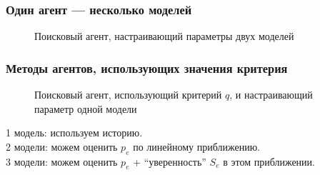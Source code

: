 \documentclass[10pt,utf8]{beamer}
\begin{document}

\begin{frame}
  \frametitle{Один агент --- несколько моделей}


  \begin{figure}[htb!]
    \begin{center}
      
    \end{center}
    \caption{Поисковый агент, настраивающий параметры двух моделей}
    \label{atu:f:agent2}
  \end{figure}


\end{frame}




\begin{frame}
  \frametitle{Методы агентов, использующих значения критерия}

  \begin{figure}[htb!]
  \begin{center}
  
  \end{center}
  \caption{Поисковый агент, использующий критерий $q$, и настраивающий параметр одной модели}
  \label{atu:f:agent1q}
  \end{figure}

  \vspace{-3ex}
  1 модель: используем историю. \\
  2 модели: можем оценить $p_e$ по линейному приближению. \\
  3 модели: можем оценить $p_e$ + ``уверенность'' $S_e$ в этом приближении.


\end{frame}


\end{document}
